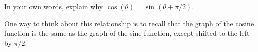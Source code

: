\documentclass{ximera}
\begin{document}
\begin{problem}
   In your own words, explain why $\cos(\theta) = \sin(\theta + \pi/2)$.
   \begin{freeResponse}
   	One way to think about this relationship is to recall that the graph
	of the cosine function is the same as the graph of the sine function,
	except shifted to the left by $\pi/2$.
   \end{freeResponse}
\end{problem}


\end{document}
